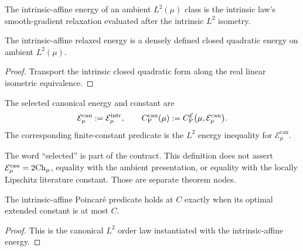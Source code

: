 \begin{definition}
  \label{def:intrinsic-affine-energy}
  \leanok
  The intrinsic-affine energy of an ambient $L^2(\mu)$ class is the intrinsic law's
  smooth-gradient relaxation evaluated after the intrinsic $L^2$ isometry.
\end{definition}

\begin{theorem}
  \label{thm:intrinsic-affine-energy-closed}
  \leanok
  The intrinsic-affine relaxed energy is a densely defined closed quadratic energy on ambient
  $L^2(\mu)$.
\end{theorem}
\begin{proof}
  \leanok
  Transport the intrinsic closed quadratic form along the real linear isometric equivalence.
\end{proof}

\begin{definition}
  \label{def:selected-canonical-frontend}
  \leanok
  The selected canonical energy and constant are
  \[
    \mathcal E^{\mathrm{can}}_\mu
      :=\mathcal E^{\mathrm{intr}}_\mu,
    \qquad
    C_{\mathrm P}^{\mathrm{can}}(\mu)
      :=C_{\mathrm P}^{\mathcal E}\bigl(\mu,\mathcal E^{\mathrm{can}}_\mu\bigr).
  \]
  The corresponding finite-constant predicate is the $L^2$ energy inequality for
  $\mathcal E^{\mathrm{can}}_\mu$.
\end{definition}

The word ``selected'' is part of the contract.  This definition does not assert
$\mathcal E^{\mathrm{can}}_\mu=2\mathrm{Ch}_\mu$, equality with the ambient presentation, or equality with
the locally Lipschitz literature constant.  Those are separate theorem nodes.

\begin{theorem}
  \label{thm:intrinsic-affine-constant-order}
  \leanok
  The intrinsic-affine Poincar\'e predicate holds at $C$ exactly when its optimal extended
  constant is at most $C$.
\end{theorem}
\begin{proof}
  \leanok
  This is the canonical $L^2$ order law instantiated with the intrinsic-affine energy.
\end{proof}
